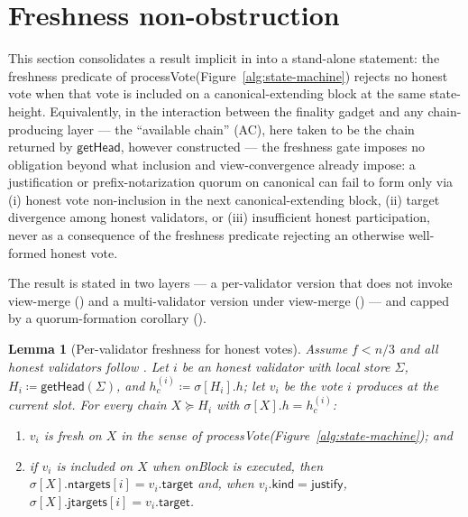 \documentclass{article}
\newcommand{\target}{\mathsf{target}}
\newcommand{\kind}{\mathsf{kind}}
\newcommand{\just}{\ensuremath{\mathsf{justify}}\xspace}
\newcommand{\jtargets}{\mathsf{jtargets}}
\newcommand{\ntargets}{\mathsf{ntargets}}
\newcommand{\processVote}{\textsf{processVote}\xspace}
\newcommand{\onBlock}{\textsf{onBlock}\xspace}
\newcommand{\getHead}{\textsf{getHead}\xspace}
\theoremstyle{plain}
\newtheorem{lemma}{Lemma}
\theoremstyle{definition}
\theoremstyle{remark}
\begin{document}
\section{Freshness non-obstruction}\label{sec:freshness-non-obstruction}

This section consolidates a result implicit in  into a stand-alone statement: the freshness predicate of \processVote (Figure~\ref{alg:state-machine}) rejects no honest vote when that vote is included on a canonical-extending block at the same state-height.
Equivalently, in the interaction between the finality gadget and any chain-producing layer --- the ``available chain'' (AC), here taken to be the chain returned by $\getHead$, however constructed --- the freshness gate imposes no obligation beyond what inclusion and view-convergence already impose: a justification or prefix-notarization quorum on canonical can fail to form only via (i) honest vote non-inclusion in the next canonical-extending block, (ii) target divergence among honest validators, or (iii) insufficient honest participation, never as a consequence of the freshness predicate rejecting an otherwise well-formed honest vote.

The result is stated in two layers --- a per-validator version that does not invoke view-merge () and a multi-validator version under view-merge () --- and capped by a quorum-formation corollary ().

\begin{lemma}[Per-validator freshness for honest votes]\label{lem:freshness-honest-local}
Assume $f < n/3$ and all honest validators follow .
Let $i$ be an honest validator with local store $\Sigma$, $H_i \coloneqq \getHead(\Sigma)$, and $h_c^{(i)} \coloneqq \sigma[H_i].h$; let $v_i$ be the vote $i$ produces at the current slot.
For every chain $X \succeq H_i$ with $\sigma[X].h = h_c^{(i)}$:
\begin{enumerate}
  \item $v_i$ is fresh on $X$ in the sense of \processVote (Figure~\ref{alg:state-machine}); and
  \item if $v_i$ is included on $X$ when \onBlock is executed, then $\sigma[X].\ntargets[i] = v_i.\target$ and, when $v_i.\kind = \just$, $\sigma[X].\jtargets[i] = v_i.\target$.
\end{enumerate}
\end{lemma}
\end{document}
